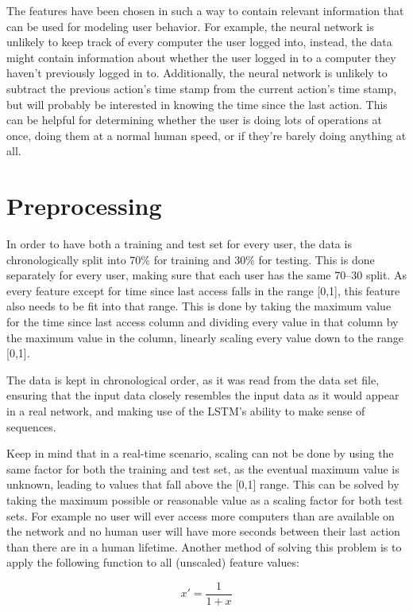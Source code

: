 The features have been chosen in such a way to contain relevant information that can be used for modeling user behavior. For example, the neural network is unlikely to keep track of every computer the user logged into, instead, the data might contain information about whether the user logged in to a computer they haven't previously logged in to. Additionally, the neural network is unlikely to subtract the previous action's time stamp from the current action's time stamp, but will probably be interested in knowing the time since the last action. This can be helpful for determining whether the user is doing lots of operations at once, doing them at a normal human speed, or if they're barely doing anything at all.

\section{Preprocessing}
In order to have both a training and test set for every user, the data is chronologically split into 70\% for training and 30\% for testing. This is done separately for every user, making sure that each user has the same 70--30 split. As every feature except for time since last access falls in the range [0,1], this feature also needs to be fit into that range. This is done by taking the maximum value for the time since last access column and dividing every value in that column by the maximum value in the column, linearly scaling every value down to the range [0,1].

The data is kept in chronological order, as it was read from the data set file, ensuring that the input data closely resembles the input data as it would appear in a real network, and making use of the LSTM's ability to make sense of sequences.

Keep in mind that in a real-time scenario, scaling can not be done by using the same factor for both the training and test set, as the eventual maximum value is unknown, leading to values that fall above the [0,1] range. This can be solved by taking the maximum possible or reasonable value as a scaling factor for both test sets. For example no user will ever access more computers than are available on the network and no human user will have more seconds between their last action than there are in a human lifetime. Another method of solving this problem is to apply the following function to all (unscaled) feature values:

\begin{equation} \label{eq:normalize_2}
x' = \dfrac{1}{1+x}
\end{equation}

